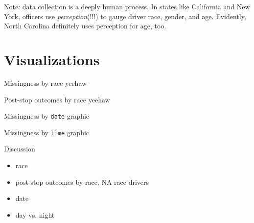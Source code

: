\documentclass[11pt]{beamer}
\begin{document}
\begin{frame}{Note: data collection is a deeply human process.}
	In states like California and New York, officers use \emph{perception}(!!!) to gauge driver race, gender, and age. Evidently, North Carolina definitely uses perception for age, too. 
\end{frame}

\section{Visualizations}

\begin{frame}{Missingness by race}
yeehaw
\end{frame}

\begin{frame}{Post-stop outcomes by race}
yeehaw
\end{frame}

\begin{frame}{Missingness by \texttt{date}}
graphic
\end{frame}

\begin{frame}{Missingness by \texttt{time}}
graphic
\end{frame}

\begin{frame}{Discussion}
	\begin{itemize}
	\item race
	\item post-stop outcomes by race, NA race drivers
	\item date
	\item day vs. night
	\end{itemize}
\end{frame}

\end{document}
